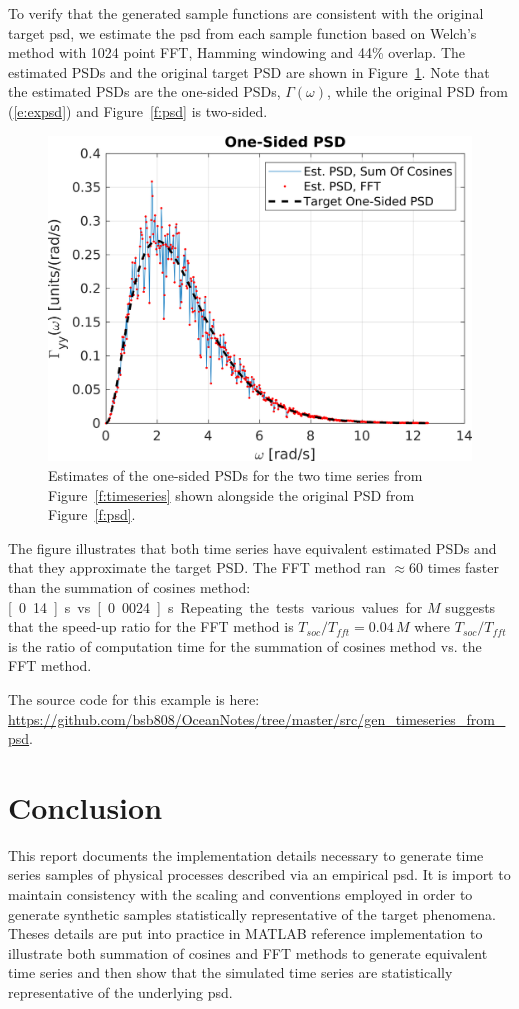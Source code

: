 \documentclass[techreport, article]{npsreport2018}
\begin{document}
To verify that the generated sample functions are consistent with the original target \ac{psd}, we estimate the \ac{psd} from each sample function based on Welch's method with 1024 point FFT, Hamming windowing and 44\% overlap.  The estimated PSDs and the original target PSD are shown in Figure~\ref{f:psdest}.  Note that the estimated PSDs are the one-sided PSDs, $\Gamma(\omega)$, while the original PSD from (\ref{e:expsd}) and Figure~\ref{f:psd} is two-sided.
\begin{figure}[hbt!]
  \centering
  \includegraphics[width=\FigWidth\textwidth]{images/psdest.png}
  \caption{Estimates of the one-sided PSDs for the two time series from Figure~\ref{f:timeseries} shown alongside the original PSD from Figure~\ref{f:psd}. }
  \label{f:psdest}
\end{figure}
The figure illustrates that both time series have equivalent estimated PSDs and that they approximate the target PSD.  The FFT method ran $\approx 60$ times faster than the summation of cosines method: \unit[0.14]{s} vs. \unit[0.0024]{s}.  Repeating the tests various values for $M$ suggests that the speed-up ratio for the FFT method is $T_{soc}/T_{fft} = 0.04 \, M$ where $T_{soc}/T_{fft}$ is the ratio of computation time for the summation of cosines method vs. the FFT method.

The source code for this example is here: \url{https://github.com/bsb808/OceanNotes/tree/master/src/gen_timeseries_from_psd}.


\section{Conclusion}
This report documents the implementation details necessary to generate time series samples of physical processes described via an empirical \ac{psd}. It is import to maintain consistency with the scaling and conventions employed in order to generate synthetic samples statistically representative of the target phenomena.  Theses details are put into practice in MATLAB reference implementation to illustrate both summation of cosines and FFT methods to generate equivalent time series and then show that the simulated time series are statistically representative of the underlying \ac{psd}.
\end{document}
